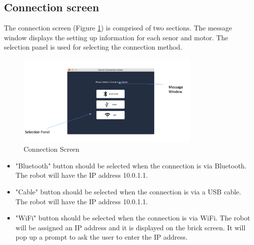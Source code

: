 \documentclass[12pt,a4paper]{article}
\begin{document}
\subsection{Connection screen} 
The connection screen (Figure \ref{connection screen})  is comprised of two sections. The message window displays the setting up information for each senor and motor. The selection panel is used for selecting the connection method.
\begin{figure}[!htb]
\centering
\includegraphics[width=0.8\textwidth]{ConnectionScreen.png}
\caption{Connection Screen}
\label{connection screen}
\end{figure}

\begin{itemize}
\item "Bluetooth" button should be selected when the connection is via Bluetooth. The robot will have the IP address 10.0.1.1. 
\item "Cable" button should be selected when the connection is via a USB cable. The robot will have the IP address 10.0.1.1. 
\item "WiFi" button should be selected when the connection is via WiFi. The robot will be assigned an IP address and it is displayed on the brick screen. It will pop up a prompt to ask the user to enter the IP address. 
\end{itemize}
\newpage
\end{document}
